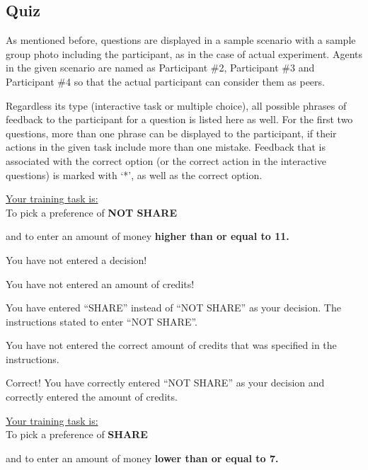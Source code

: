 \subsection{Quiz}

As mentioned before, questions are displayed in a sample scenario with a sample group photo including the participant, as in the case of actual experiment. Agents in the given scenario are named as Participant \#2, Participant \#3 and Participant \#4 so that the actual participant can consider them as peers.

Regardless its type (interactive task or multiple choice), all possible phrases of feedback to the participant for a question is listed here as well. For the first two questions, more than one phrase can be displayed to the participant, if their actions in the given task include more than one mistake. Feedback that is associated with the correct option (or the correct action in the interactive questions) is marked with `*', as well as the correct option.  



\underline{Your training task is:} \\

To pick a preference of \textbf{NOT SHARE}

and to enter an amount of money \textbf{higher than or equal to 11.}


 You have not entered a decision!

 You have not entered an amount of credits!

 You have entered ``SHARE'' instead of ``NOT SHARE'' as your decision. The instructions stated to enter ``NOT SHARE''.

 You have not entered the correct amount of credits that was specified in the instructions.

 Correct! You have correctly entered ``NOT SHARE'' as your decision and correctly entered the amount of credits.



\underline{Your training task is:} \\

To pick a preference of \textbf{SHARE}

and to enter an amount of money \textbf{lower than or equal to 7.}

